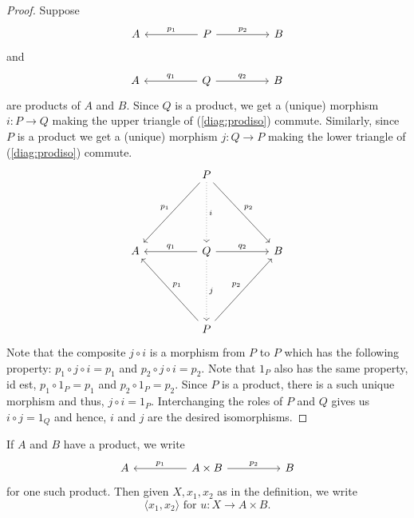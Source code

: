 \begin{proof}
	Suppose
	\begin{equation*} 
		\begin{tikzcd}
			A && P \arrow[ll, "p_1"'] \arrow[rr, "p_2"] && B
		\end{tikzcd}
	\end{equation*}
	and
	\begin{equation*} 
		\begin{tikzcd}
			A && Q \arrow[ll, "q_1"'] \arrow[rr, "q_2"] && B
		\end{tikzcd}
	\end{equation*}
	are products of $A$ and $B.$ Since $Q$ is a product, we get a (unique) morphism $i:P \to Q$ making the upper triangle of (\ref{diag:prodiso}) commute. Similarly, since $P$ is a product we get a (unique) morphism $j:Q\to P$ making the lower triangle of (\ref{diag:prodiso}) commute.
	\begin{equation} \label{diag:prodiso}
		\begin{tikzcd}
			&& P \arrow[llddd, "p_1"'] \arrow[rrddd, "p_2"] \arrow[ddd, dotted, "i"] &&\\
			&&&&\\&&&&\\
			A && Q \arrow[ll, "q_1"'] \arrow[rr, "q_2"] \arrow[ddd, dotted, "j"] && B\\
			&&&&\\&&&&\\
			&& P \arrow[lluuu, "p_1"'] \arrow[rruuu, "p_2"] &&
		\end{tikzcd}
	\end{equation}
	Note that the composite $j\circ i$ is a morphism from $P$ to $P$ which has the following property: $p_1 \circ j \circ i = p_1$ and $p_2 \circ j \circ i = p_2.$ Note that $1_P$ also has the same property, id est, $p_1 \circ 1_P = p_1$ and $p_2 \circ 1_P = p_2.$ Since $P$ is a product, there is a such unique morphism and thus, $j\circ i = 1_P.$ Interchanging the roles of $P$ and $Q$ gives us $i \circ j = 1_Q$ and hence, $i$ and $j$ are the desired isomorphisms.
\end{proof}
If $A$ and $B$ have a product, we write
\begin{equation} 
	\begin{tikzcd}
		A && A \times B \arrow[ll, "p_1"'] \arrow[rr, "p_2"] && B
	\end{tikzcd}
\end{equation}
for one such product. Then given $X, x_1, x_2$ as in the definition, we write
\begin{equation} \label{eq:prodpair}
	\langle x_1, x_2\rangle \text{ for } u:X\to A\times B.
\end{equation}
